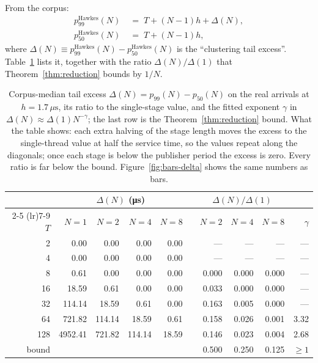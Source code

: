 \documentclass[11pt]{article}
\begin{document}
From the corpus:
\begin{align}
p_{99}^{\mathrm{Hawkes}}(N) &\;=\; T + (N-1)h + \Delta(N), \label{eq:design99} \\
p_{50}^{\mathrm{Hawkes}}(N) &\;=\; T + (N-1)h, \label{eq:design50}
\end{align}
where $\Delta(N) \equiv p_{99}^{\mathrm{Hawkes}}(N) - p_{50}^{\mathrm{Hawkes}}(N)$ is the
``clustering tail excess''. Table~\ref{tab:delta} lists it, together with the ratio
$\Delta(N)/\Delta(1)$ that Theorem~\ref{thm:reduction} bounds by $1/N$.

\begin{table}[H]
\centering
\begin{tabular}{@{}r rrrr r rrr r@{}}
\toprule
 & \multicolumn{4}{c}{$\Delta(N)$ (\si{\micro\second})} & & \multicolumn{3}{c}{$\Delta(N)/\Delta(1)$} & \\
\cmidrule(lr){2-5} \cmidrule(lr){7-9}
$T$ & $N{=}1$ & $N{=}2$ & $N{=}4$ & $N{=}8$ & & $N{=}2$ & $N{=}4$ & $N{=}8$ & $\gamma$ \\
\midrule
 2 &    0.00 &    0.00 &    0.00 &    0.00 & & --- & --- & --- & --- \\
 4 &    0.00 &    0.00 &    0.00 &    0.00 & & --- & --- & --- & --- \\
 8 &    0.61 &    0.00 &    0.00 &    0.00 & & 0.000 & 0.000 & 0.000 & --- \\
16 &   18.59 &    0.61 &    0.00 &    0.00 & & 0.033 & 0.000 & 0.000 & --- \\
32 &  114.14 &   18.59 &    0.61 &    0.00 & & 0.163 & 0.005 & 0.000 & --- \\
64 &  721.82 &  114.14 &   18.59 &    0.61 & & 0.158 & 0.026 & 0.001 & 3.32 \\
128 & 4952.41 &  721.82 &  114.14 &   18.59 & & 0.146 & 0.023 & 0.004 & 2.68 \\
\midrule
bound & & & & & & 0.500 & 0.250 & 0.125 & $\ge 1$ \\
\bottomrule
\end{tabular}
\caption{Corpus-median tail excess $\Delta(N) = p_{99}(N) - p_{50}(N)$ on the real arrivals at
$h = 1.7\,\mu\mathrm{s}$, its ratio to the single-stage value, and the fitted exponent
$\gamma$ in $\Delta(N) \approx \Delta(1) N^{-\gamma}$; the last row is the
Theorem~\ref{thm:reduction} bound. What the table shows: each extra halving of the stage
length moves the excess to the single-thread value at half the service time, so the
values repeat along the diagonals; once each stage is below the publisher period the
excess is zero. Every ratio is far below the bound. Figure~\ref{fig:bars-delta} shows the same numbers as bars.}
\label{tab:delta}
\end{table}
\end{document}
